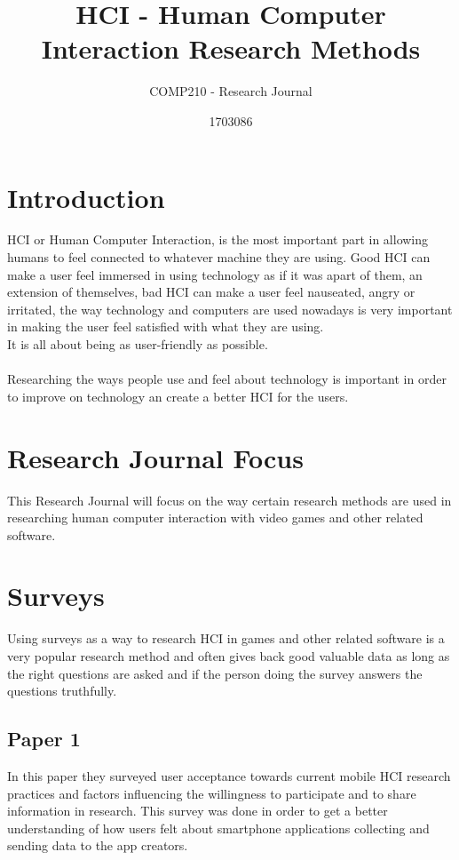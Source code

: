 \documentclass{scrartcl}
\title{HCI - Human Computer Interaction Research Methods}
\subtitle{COMP210 - Research Journal}
\author{1703086}
\begin{document}
\maketitle


\section{Introduction}
HCI or Human Computer Interaction, is the most important part in allowing humans to feel connected to whatever machine they are using. Good HCI can make a user feel immersed in using technology as if it was apart of them, an extension of themselves, bad HCI can make a user feel nauseated, angry or irritated, the way technology and computers are used nowadays is very important in making the user feel satisfied with what they are using.
\\
It is all about being as user-friendly as possible.
\\
\\
Researching the ways people use and feel about technology is important in order to improve on technology an create a better HCI for the users.

\section{Research Journal Focus}
This Research Journal will focus on the way certain research methods are used in researching human computer interaction with video games and other related software.

\section{Surveys}
Using surveys as a way to research HCI in games and other related software is a very popular research method and often gives back good valuable data as long as the right questions are asked and if the person doing the survey answers the questions truthfully.

\subsection{Paper 1 \cite{one}}
In this paper they surveyed user acceptance towards current mobile HCI research practices and factors influencing the willingness to participate and to share information in research.
This survey was done in order to get a better understanding of how users felt about smartphone applications collecting and sending data to the app creators.
\end{document}
